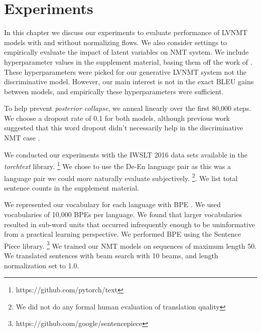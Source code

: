 \chapter{Experiments}

In this chapter we discuss our experiments to evaluate performance of \ac{LVNMT} models with and without normalizing flows. We also consider settings to empirically evaluate the impact of latent variables on \ac{NMT} system. We include hyperparameter values in the supplement material, basing them off the work of \citet{eikema2018AEVNMT}. These hyperparameters were picked for our generative \ac{LVNMT} system not the discriminative model. However, our main interest is not in the exact BLEU gains between models, and empirically these hyperparameters were sufficient.

To help prevent \textit{posterior collapse}, we anneal  linearly over the first 80,000 steps. We choose a dropout rate of 0.1 for both models, although previous work suggested that this word dropout didn't necessarily help in the discriminative \ac{NMT} case \cite{harshil2018GNMT}. %

We conducted our experiments with the IWSLT 2016 data sets available in the \textit{torchtext} library. \footnote{https://github.com/pytorch/text} We chose to use the De-En language pair as this was a language pair we could more naturally evaluate subjectively. \footnote{ We did not do any formal human evaluation of translation quality}. We list total sentence counts in the supplement material. %

We represented our vocabulary for each language with \ac{BPE} \cite{sennrich2015NMTRarwordsBPE}. We used vocabularies of 10,000 \ac{BPE}s per language. We found that larger vocabularies resulted in sub-word units that occurred infrequently enough to be uninformative from a practical learning perspective. We performed \ac{BPE} using the Sentence Piece library. \footnote{https://github.com/google/sentencepiece} We trained our \ac{NMT} models on sequences of maximum length 50. We translated sentences with beam search with 10 beams, and length normalization set to 1.0. %


